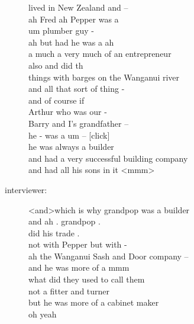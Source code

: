 \documentclass{article}
\newcommand{\turn}[2]{
\item[#1:] #2
}
\begin{document}
\begin{description}
{lived in New Zealand and --\\
ah Fred ah Pepper was a\\
um plumber guy -\\
ah but had he was a ah\\
a much a very much of an entrepreneur\\
also and did th\\
things with barges on the Wanganui river\\
and all that sort of thing -\\
and of course if\\
Arthur who was our -\\
Barry and I's grandfather --\\
he - was a um -- [click]\\
he was always a builder\\
and had a very successful building company\\
and had all his sons in it \textless mmm\textgreater }

\turn{interviewer}{\textless and\textgreater  which is why grandpop was a builder\\
and ah . grandpop .\\
did his trade .\\
not with Pepper but with -\\
ah the Wanganui Sash and Door company --\\
and he was more of a mmm\\
what did they used to call them\\
not a fitter and turner\\
but he was more of a cabinet maker\\
oh yeah}


\end{description}
\end{document}
